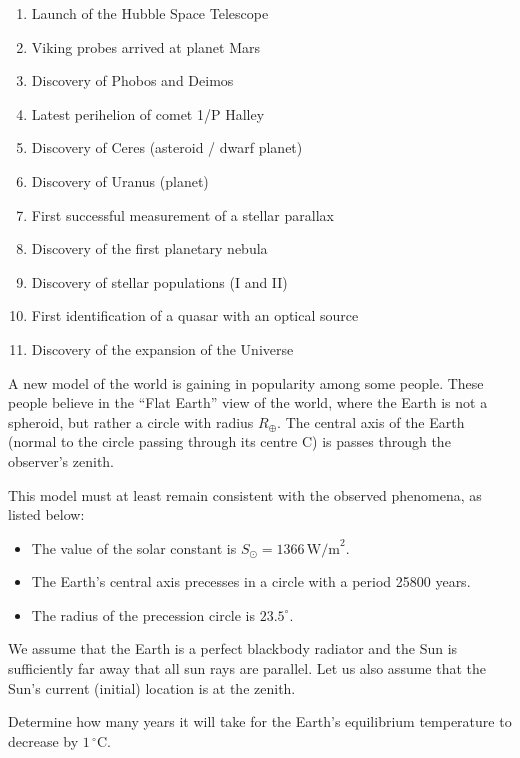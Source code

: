 \begin{enumerate}
\item Launch of the Hubble Space Telescope
\item Viking probes arrived at planet Mars
\item Discovery of Phobos and Deimos
\item Latest perihelion of comet 1/P Halley
\item Discovery of Ceres (asteroid / dwarf planet)
\item Discovery of Uranus (planet)
\item First successful measurement of a stellar parallax
\item Discovery of the first planetary nebula
\item Discovery of stellar populations (I and II)
\item First identification of a quasar with an optical source
\item Discovery of the expansion of the Universe
\end{enumerate}

A new model of the world is gaining in popularity among some people. These
people believe in the ``Flat Earth'' view of the world, where the Earth is not
a spheroid, but rather a circle with radius $R_\oplus$. The central axis of
the Earth (normal to the circle passing through its centre C) is passes
through the observer's zenith.

This model must at least remain consistent with the observed phenomena, as
listed below:
\begin{itemize}
\item The value of the solar constant is
  $S_\odot = 1366\,\mathrm{W/m}^2$.
\item The Earth's central axis precesses in a circle with a period
  25800 years.
\item The radius of the precession circle is $23.5^\circ$.
\end{itemize}

We assume that the Earth is a perfect blackbody radiator and the Sun is
sufficiently far away that all sun rays are parallel. Let us also assume that
the Sun's current (initial) location is at the zenith.

Determine how many years it will take for the Earth's equilibrium temperature
to decrease by $1\,^\circ$C.

